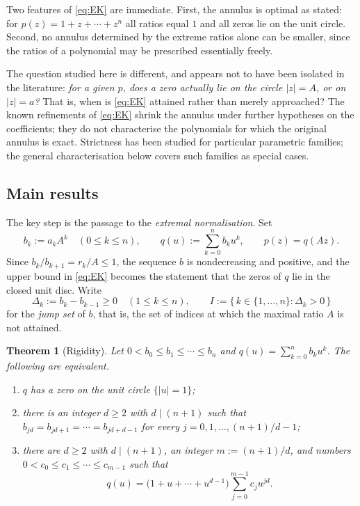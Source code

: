 \documentclass[11pt]{amsart}
\theoremstyle{plain}
\newtheorem{theorem}{Theorem}[section]
\theoremstyle{definition}
\theoremstyle{remark}
\newcommand{\abs}[1]{\lvert #1\rvert}
\newcommand{\set}[1]{\{#1\}}
\begin{document}
Two features of \eqref{eq:EK} are immediate. First, the annulus is optimal as stated: for
$p(z)=1+z+\cdots+z^{n}$ all ratios equal $1$ and all zeros lie on the unit circle. Second,
no annulus determined by the extreme ratios alone can be smaller, since the ratios of a
polynomial may be prescribed essentially freely.

The question studied here is different, and appears not to have been isolated in the
literature: \emph{for a given $p$, does a zero actually lie on the circle $\abs{z}=A$, or on
$\abs{z}=a$?} That is, when is \eqref{eq:EK} attained rather than merely approached? The
known refinements of \eqref{eq:EK} shrink the annulus under further hypotheses on the
coefficients; they do not characterise the polynomials for which the original annulus is
exact. Strictness has been studied for particular parametric families; the general
characterisation below covers such families as special cases.

\subsection{Main results}

The key step is the passage to the \emph{extremal normalisation}. Set
\begin{equation}\label{eq:normalisation}
b_k:=a_kA^{k}\quad(0\le k\le n),\qquad q(u):=\sum_{k=0}^{n}b_ku^{k},\qquad p(z)=q(Az).
\end{equation}
Since $b_k/b_{k+1}=r_k/A\le1$, the sequence $b$ is nondecreasing and positive, and the upper
bound in \eqref{eq:EK} becomes the statement that the zeros of $q$ lie in the closed unit
disc. Write
\begin{equation}\label{eq:Delta}
\Delta_k:=b_k-b_{k-1}\ge0\quad(1\le k\le n),\qquad
I:=\set{\,k\in\set{1,\dots,n}:\Delta_k>0\,}
\end{equation}
for the \emph{jump set} of $b$, that is, the set of indices at which the maximal ratio $A$
is not attained.

\begin{theorem}[Rigidity]\label{thm:rigidity}
Let $0<b_0\le b_1\le\cdots\le b_n$ and $q(u)=\sum_{k=0}^{n}b_ku^{k}$. The following are
equivalent.
\begin{enumerate}
\item[(i)] $q$ has a zero on the unit circle $\set{\abs{u}=1}$;
\item[(ii)] there is an integer $d\ge2$ with $d\mid(n+1)$ such that
$b_{jd}=b_{jd+1}=\cdots=b_{jd+d-1}$ for every $j=0,1,\dots,(n+1)/d-1$;
\item[(iii)] there are $d\ge2$ with $d\mid(n+1)$, an integer $m:=(n+1)/d$, and numbers
$0<c_0\le c_1\le\cdots\le c_{m-1}$ such that
\begin{equation}\label{eq:factorisation}
q(u)=\bigl(1+u+\cdots+u^{d-1}\bigr)\sum_{j=0}^{m-1}c_ju^{jd}.
\end{equation}
\end{enumerate}
\end{theorem}
\end{document}

